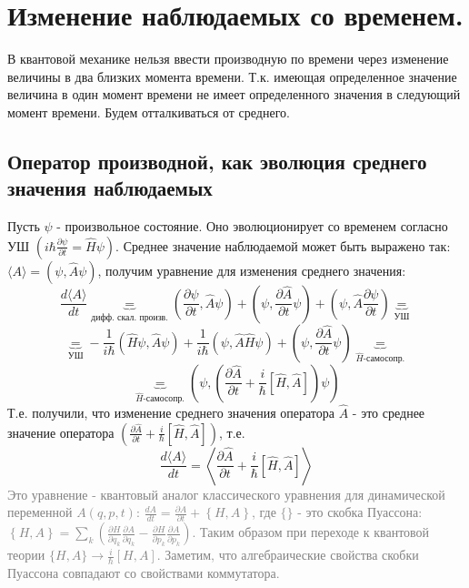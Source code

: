 \section{Изменение наблюдаемых со временем.}
	В квантовой механике нельзя ввести производную по времени через изменение величины в два близких момента времени. Т.к. имеющая определенное значение величина в один момент времени не имеет определенного значения в следующий момент времени. Будем отталкиваться от среднего.
	\subsection{Оператор производной, как эволюция среднего значения наблюдаемых}
		Пусть $\psi$ - произвольное состояние. Оно эволюционирует со временем согласно УШ $\left(i\hbar\frac{\partial\psi}{\partial t} = \hat{H}\psi\right)$. Среднее значение наблюдаемой может быть выражено так: $\langle A\rangle = (\psi,\hat{A}\psi)$, получим уравнение для изменения среднего значения:
		$$
			\frac{d\langle A\rangle}{dt} \underbrace{=}_{\text{дифф. скал. произв.}} \left(\frac{\partial\psi}{\partial t},\hat{A}\psi\right) + \left(\psi,\frac{\partial\hat{A}}{\partial t}\psi\right) + \left(\psi,\hat{A}\frac{\partial\psi}{\partial t}\right) \underbrace{=}_{\text{УШ}}
		$$
		$$
			\underbrace{=}_{\text{УШ}} -\frac{1}{i\hbar}\left(\hat{H}\psi,\hat{A}\psi\right)+\frac{1}{i\hbar}\left(\psi,\hat{A}\hat{H}\psi\right)+\left(\psi,\frac{\partial\hat{A}}{\partial t}\psi\right) \underbrace{=}_{\hat{H}\text{-самосопр.}}
		$$
		$$
			\underbrace{=}_{\hat{H}\text{-самосопр.}} \left(\psi,\left(\frac{\partial\hat{A}}{\partial t} + \frac{i}{\hbar}\left[\hat{H},\hat{A}\right]\right)\psi\right)
		$$
		Т.е. получили, что изменение среднего значения оператора $\hat{A}$ - это среднее значение оператора $\left(\frac{\partial\hat{A}}{\partial t} + \frac{i}{\hbar}\left[\hat{H},\hat{A}\right]\right)$, т.е.
		$$
			\frac{d\langle A\rangle}{dt} = \left\langle \frac{\partial\hat{A}}{\partial t} + \frac{i}{\hbar}\left[\hat{H},\hat{A}\right] \right\rangle 
		$$
		\textcolor{gray}{
			Это уравнение - квантовый аналог классического уравнения для динамической переменной $A(q,p,t)$: $\frac{dA}{dt} = \frac{\partial A}{\partial t} + \left\{H,A\right\}$, где $\{\}$ - это скобка Пуассона: $\left\{H,A\right\} = \sum\limits_k\left(\frac{\partial H}{\partial q_k}\frac{\partial A}{\partial q_k} - \frac{\partial H}{\partial p_k}\frac{\partial A}{\partial p_k}\right)$. Таким образом при переходе к квантовой теории $\{H,A\} \rightarrow \frac{i}{\hbar}[H,A]$. Заметим, что алгебраические свойства скобки Пуассона совпадают со свойствами коммутатора.\\
		}
